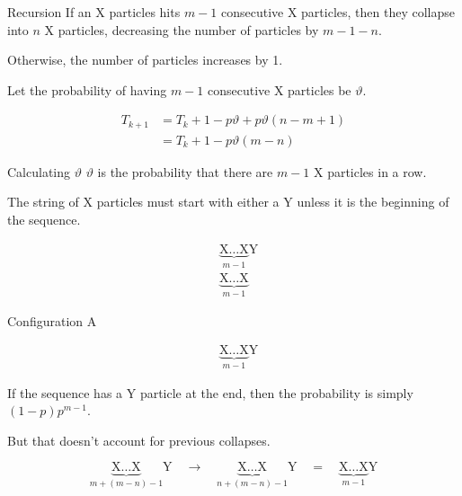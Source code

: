 \documentclass[xcolor={usenames,dvipsnames}]{beamer}
\begin{document}
\begin{frame}{Recursion}
  If an X particles hits $m-1$ consecutive X particles, then they collapse into $n$ X particles, decreasing the number of particles by $m-1-n$.

  Otherwise, the number of particles increases by 1.

  Let the probability of having  $m-1$ consecutive X particles be $\vartheta$. 

  \begin{align*}
    T_{k+1} &= T_k + 1-p\vartheta + p\vartheta(n-m+1) \\
            &= T_k + 1 - p\vartheta(m - n)
  \end{align*}
\end{frame}
\begin{frame}{Calculating $\vartheta$}
  $\vartheta$ is the probability that there are $m-1$ X particles in a row.

  The string of X particles must start with either a Y unless it is the beginning of the sequence.
  \begin{figure}[H]
    \vspace{-1.5em}
    \begin{align*}
        &\underbrace{\text{X}\dots\text{X}}_{m-1}\text{Y} \tag{A}\\
        &\underbrace{\text{X}\dots\text{X}}_{m-1} \tag{B}
    \end{align*}
    \vspace{-2em}
  \end{figure}
\end{frame}
\begin{frame}{Configuration A}
    \begin{figure}[H]
    \vspace{-1.5em}
    \begin{align*}
        &\underbrace{\text{X}\dots\text{X}}_{m-1}\text{Y} \tag{A}
    \end{align*}
    \vspace{-2em}
  \end{figure}

  If the sequence has a Y particle at the end, then the probability is simply $(1-p)p^{m-1}$.

  But that doesn't account for previous collapses.
  \begin{figure}[H]
      \vspace{-1.5em}
      \begin{equation*}
        \underbrace{\text{X}\dots\text{X}}_{m + (m-n) - 1}\text{Y} \quad \longrightarrow \quad \underbrace{\text{X}\dots\text{X}}_{n+(m-n)-1}\text{Y}\quad = \quad \underbrace{\text{X}\dots\text{X}}_{m-1}\text{Y} 
      \end{equation*}
      \vspace{-2em}
    \end{figure}
  \end{frame}
\end{document}
